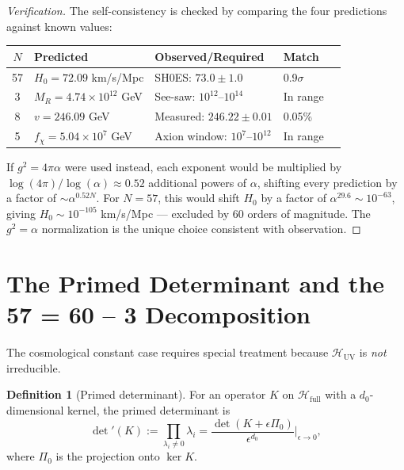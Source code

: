 \documentclass[11pt]{article}
\theoremstyle{definition}
\newtheorem{definition}[theorem]{Definition}
\theoremstyle{remark}
\begin{document}
\begin{proof}[Verification]
The self-consistency is checked by comparing the four predictions
against known values:

\begin{center}
\renewcommand{\arraystretch}{1.3}
\begin{tabular}{cllll}
\toprule
$N$ & \textbf{Predicted} & \textbf{Observed/Required} & \textbf{Match} \\
\midrule
57 & $H_0 = 72.09$ km/s/Mpc & SH0ES: $73.0 \pm 1.0$ & 0.9$\sigma$ \\
3  & $M_R = 4.74 \times 10^{12}$ GeV & See-saw: $10^{12}$--$10^{14}$ & In range \\
8  & $v = 246.09$ GeV & Measured: $246.22 \pm 0.01$ & 0.05\% \\
5  & $f_\chi = 5.04 \times 10^7$ GeV & Axion window: $10^{7}$--$10^{12}$ & In range \\
\bottomrule
\end{tabular}
\end{center}

If $g^2 = 4\pi\alpha$ were used instead, each exponent would be
multiplied by $\log(4\pi)/\log(\alpha) \approx 0.52$ additional powers
of $\alpha$, shifting every prediction by a factor of $\sim \alpha^{0.52N}$.
For $N = 57$, this would shift $H_0$ by a factor of $\alpha^{29.6} \sim
10^{-63}$, giving $H_0 \sim 10^{-105}$ km/s/Mpc --- excluded by 60
orders of magnitude. The $g^2 = \alpha$ normalization is the unique
choice consistent with observation.
\end{proof}


\section{The Primed Determinant and the 57 = 60 -- 3 Decomposition}
\label{sec:primed}

The cosmological constant case requires special treatment because
$\mathcal{H}_{\mathrm{UV}}$ is \textit{not} irreducible.

\begin{definition}[Primed determinant]
\label{def:primed}
For an operator $K$ on $\mathcal{H}_{\mathrm{full}}$ with a
$d_0$-dimensional kernel, the primed determinant is
\begin{equation}
\det\nolimits'(K) := \prod_{\lambda_i \neq 0} \lambda_i
= \frac{\det(K + \epsilon \Pi_0)}{\epsilon^{d_0}}\bigg|_{\epsilon \to 0},
\end{equation}
where $\Pi_0$ is the projection onto $\ker K$.
\end{definition}
\end{document}
